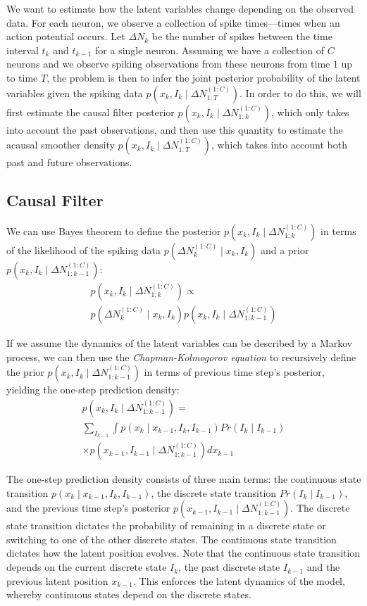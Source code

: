 \documentclass[conference]{IEEEtran}
\begin{document}
We want to estimate how the latent variables change depending on the observed data. For each neuron, we observe a collection of spike times---times when an action potential occurs. Let $\Delta N_{k}$ be the number of spikes between the time interval $t_{k}$ and $t_{k-1}$ for a single neuron. Assuming we have a collection of $C$ neurons and we observe spiking observations from these neurons from time $1$ up to time $T$, the problem is then to infer the joint posterior probability of the latent variables given the spiking data $p(x_{k}, I_{k} \mid \Delta N_{1:T}^{(1:C)})$. In order to do this, we will first estimate the causal filter posterior $p(x_{k}, I_{k} \mid \Delta N_{1:k}^{(1:C)})$, which only takes into account the past observations, and then use this quantity to estimate the acausal smoother density $p(x_{k}, I_{k} \mid \Delta N_{1:T}^{(1:C)})$, which takes into account both past and future observations.

\subsection{Causal Filter}
We can use Bayes theorem to define the posterior $p(x_{k}, I_{k} \mid \Delta N_{1:k}^{(1:C)})$ in terms of the likelihood of the spiking data $p(\Delta N_{k}^{(1:C)} \mid x_{k}, I_{k})$ and a prior $p(x_{k}, I_{k} \mid \Delta N_{1:k-1}^{(1:C)})$:
\begin{multline}
p(x_{k}, I_{k} \mid \Delta N_{1:k}^{(1:C)}) \propto \\
p(\Delta N_{k}^{(1:C)}  \mid x_{k}, I_{k}) p(x_{k}, I_{k} \mid \Delta N_{1:k-1}^{(1:C)}) 
\end{multline}

If we assume the dynamics of the latent variables can be described by a Markov process, we can then use the \textit{Chapman-Kolmogorov equation} to recursively define the prior $p(x_{k}, I_{k} \mid \Delta N_{1:k-1}^{(1:C)})$ in terms of previous time step's posterior, yielding the one-step prediction density:
\begin{multline}
p(x_{k}, I_{k} \mid \Delta N_{1:k-1}^{(1:C)}) = \\
\sum_{I_{k-1}} \int p(x_{k} \mid x_{k-1}, I_{k}, I_{k-1}) Pr(I_{k} \mid I_{k-1}) \\
\times p(x_{k-1}, I_{k-1} \mid \Delta N_{1:k-1}^{(1:C)}) dx_{k-1}
\end{multline}

The one-step prediction density consists of three main terms: the continuous state transition $p(x_{k} \mid x_{k-1}, I_{k}, I_{k-1})$, the discrete state transition $Pr(I_{k} \mid I_{k-1})$, and the previous time step's posterior $p(x_{k-1}, I_{k-1} \mid \Delta N_{1:k-1}^{(1:C)})$. The discrete state transition dictates the probability of remaining in a discrete state or switching to one of the other discrete states. The continuous state transition dictates how the latent position evolves. Note that the continuous state transition depends on the current discrete state $I_{k}$, the past discrete state $I_{k-1}$ and the previous latent position $x_{k-1}$. This enforces the latent dynamics of the model, whereby continuous states depend on the discrete states.
\end{document}
